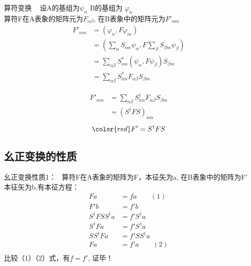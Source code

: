 \begin{frame} {算符变换}
    \例[4.试证明同一力学量算符在两不同表象中的矩阵变换是幺正变换]{}  
    \证~ 设A的基组为$\psi_\alpha$ B的基组为 $\varphi_n$\\
    算符F在A表象的矩阵元为$F_{\alpha\beta}$, 在B表象中的矩阵元为$F'_{nm}$
    \begin{equation*}
        \begin{split}
            F'_{nm} &= (\varphi_n, F\varphi_m) \\
            &= (\sum_{\alpha} S_{\alpha n}\psi_\alpha, F \sum_{\beta} S_{\beta m}\psi_\beta)\\
            &= \sum_{\alpha\beta} S_{\alpha n} ^* (\psi_\alpha, F \psi_\beta) S_{\beta m}\\
            &= \sum_{\alpha\beta} S_{\alpha n} ^* F_{\alpha\beta} S_{\beta m}
        \end{split} 
    \end{equation*}
\end{frame}


\begin{frame} 
    \begin{equation*}
    \begin{split}
        F'_{nm} &= \sum_{\alpha\beta} S_{n\alpha } ^{\dagger} F_{\alpha\beta} S_{\beta m} \\
        &= (S^{\dagger} F S)_{nm}
    \end{split} 
    \end{equation*} 
    $$\color{red} F'= S^{\dagger} F S $$
\end{frame}

\subsection{幺正变换的性质}

\begin{frame} {幺正变换性质1：}
    \例[5.试证明幺正变换不改变算符的本征值]{} 
    \证~算符F在A表象的矩阵为F，本征矢为a, 在B表象中的矩阵为F' 本征矢为b,有本征方程：
    \begin{equation*}
        \begin{split}
            Fa&=fa \qquad (1)\\
            F'b&=f'b\\
            S^{\dagger} F S S^{\dagger}a &=f'S^{\dagger}a\\
            S^{\dagger} F a &=f'S^{\dagger}a\\
            SS^{\dagger} F a &=f'SS^{\dagger}a\\
            F a &=f'a \qquad (2)\\
        \end{split} 
    \end{equation*} 
    比较（1）（2）式，有$f=f'$, 证毕！
\end{frame}    

